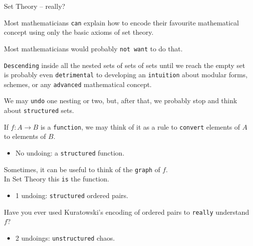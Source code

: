 \documentclass{beamer}
\begin{document}
\begin{frame}[fragile]{Set Theory -- really?}

Most mathematicians {\color{violet}\verb`can`} explain how to encode their favourite mathematical concept using only the basic axioms of set theory.

Most mathematicians would probably {\color{violet}\verb`not want`} to do that.

{\color{violet}\verb`Descending`} inside all the nested sets of sets of sets until we reach the empty set is probably even {\color{violet}\verb`detrimental`} to developing an {\color{violet}\verb`intuition`} about modular forms, schemes, or any {\color{violet}\verb`advanced`} mathematical concept.
\end{frame}

\begin{frame}[fragile]

We may {\color{violet}\verb`undo`} one nesting or two, but, after that, we probably stop and think about {\color{violet}\verb`structured`} sets.

If $f \colon A \longrightarrow B$ is a {\color{violet}\verb`function`}, we may think of it as a rule to {\color{violet}\verb`convert`} elements of $A$ to elements of $B$.
\vspace{-13pt}
\begin{itemize}
\setlength\itemsep{-12pt}
\item
  No undoing: a {\color{violet}\verb`structured`} function.
\end{itemize}

Sometimes, it can be useful to think of the {\color{violet}\verb`graph`} of $f$.
\\
In Set Theory this {\color{violet}\verb`is`} the function.
\vspace{-13pt}
\begin{itemize}
\setlength\itemsep{-12pt}
\item
  1 undoing: {\color{violet}\verb`structured`} ordered pairs.
\end{itemize}

Have you ever used Kuratowski's encoding of ordered pairs to {\color{violet}\verb`really`} understand $f$?
\vspace{-13pt}
\begin{itemize}
\setlength\itemsep{-12pt}
\item
  2 undoings: {\color{violet}\verb`unstructured`} chaos.
\end{itemize}
\end{frame}
\end{document}
